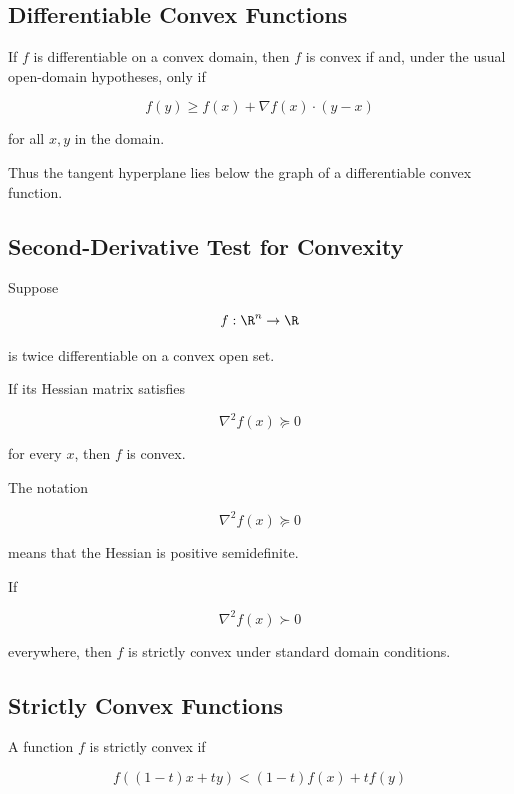 \subsection{Differentiable Convex Functions}
\label{subsec:differentiable-convex-functions}

If \(f\) is differentiable on a convex domain, then \(f\) is convex if and,
under the usual open-domain hypotheses, only if

\[
\boxed{
f(y)
\geq
f(x)
+
\nabla f(x)\cdot(y-x)
}
\]

for all \(x,y\) in the domain.

Thus the tangent hyperplane lies below the graph of a differentiable convex
function.

\subsection{Second-Derivative Test for Convexity}
\label{subsec:hessian-convexity}

Suppose

\[
f:\R^n\to\R
\]

is twice differentiable on a convex open set.

If its Hessian matrix satisfies

\[
\boxed{
\nabla^2f(x)\succeq0
}
\]

for every \(x\), then \(f\) is convex.

The notation

\[
\nabla^2f(x)\succeq0
\]

means that the Hessian is positive semidefinite.

If

\[
\boxed{
\nabla^2f(x)\succ0
}
\]

everywhere, then \(f\) is strictly convex under standard domain conditions.

\subsection{Strictly Convex Functions}
\label{subsec:strictly-convex-functions}

A function \(f\) is strictly convex if

\[
\boxed{
f((1-t)x+ty)
<
(1-t)f(x)+tf(y)
}
\]

